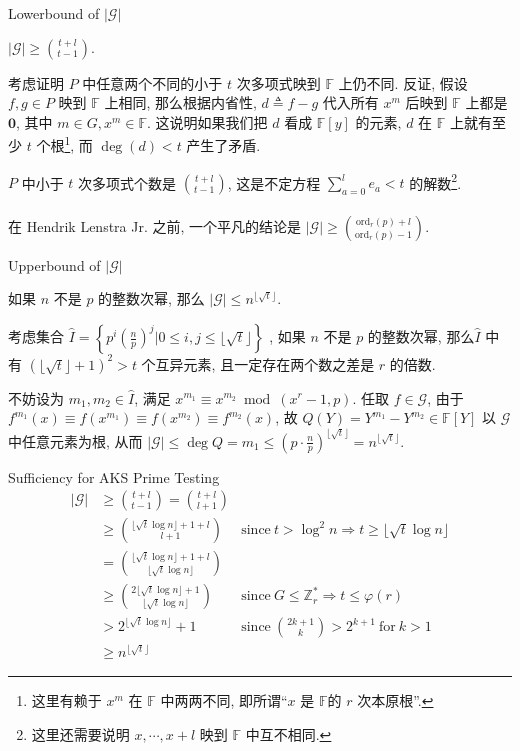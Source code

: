 \documentclass{beamer}
\def\le{\leqslant}
\def\ge{\geqslant}
\def\ord{\textrm{ord}}
\begin{document}
\begin{frame}{Lowerbound of $|\mathcal G|$}
	\begin{lemma}
		$|\mathcal G| \ge \binom{t + l}{t - 1}$.
	\end{lemma}
	考虑证明 $P$ 中任意两个不同的小于 $t$ 次多项式映到 $\mathbb F$ 上仍不同. 反证, 假设 $f, g \in P$ 映到 $\mathbb F$ 上相同, 那么根据内省性, $d \triangleq f - g$ 代入所有 $x^m$ 后映到 $\mathbb F$ 上都是 $\mathbf{0}$, 其中 $m \in G, x^m \in \mathbb F$. 这说明如果我们把 $d$ 看成 $\mathbb F[y]$ 的元素, $d$ 在 $\mathbb F$ 上就有至少 $t$ 个根\footnote{\tiny 这里有赖于 $x^m$ 在 $\mathbb F$ 中两两不同, 即所谓“$x$ 是 $\mathbb F$的 $r$ 次本原根”.}, 而 $\deg (d) < t$ 产生了矛盾. 

	$P$ 中小于 $t$ 次多项式个数是 $\binom{t + l}{t - 1}$, 这是不定方程 $\sum\limits_{a=0}^{l}e_a < t$ 的解数\footnote{\tiny 这里还需要说明 $x, \cdots, x + l$ 映到 $\mathbb F$ 中互不相同.}.\\~\\

	{\kaishu{} 在 Hendrik Lenstra Jr. 之前, 一个平凡的结论是 $|\mathcal G| \ge \binom{\ord_r(p) + l}{\ord_r(p) - 1}$.}

\end{frame}
\begin{frame}{Upperbound of $|\mathcal G|$}
	\begin{lemma}
		如果 $n$ 不是 $p$ 的整数次幂, 那么 $|\mathcal G| \le n^{\lfloor\sqrt{t}\rfloor}$.
	\end{lemma}
	考虑集合 $\hat{I} = \left\{p^i\left(\frac np\right)^j \bigg| 0 \le i, j \le \lfloor \sqrt {t}\rfloor \right\}$ , 如果 $n$ 不是 $p$ 的整数次幂, 那么$\hat{I}$ 中有 $(\lfloor\sqrt t\rfloor + 1)^2 > t$ 个互异元素, 且一定存在两个数之差是 $r$ 的倍数.
	
	不妨设为 $m_1, m_2 \in \hat{I}$, 满足 $x^{m_1} \equiv x^{m_2} \bmod (x^r-1, p)$. 任取 $f \in \mathcal G$, 由于 $f^{m_1}(x) \equiv f(x^{m_1}) \equiv f(x^{m_2}) \equiv f^{m_2}(x)$, 故 $Q(Y) = Y^{m_1} - Y^{m_2} \in \mathbb F[Y]$ 以 $\mathcal G$ 中任意元素为根, 从而 $|\mathcal G| \le \deg Q = m_1 \le (p \cdot \frac np)^{\lfloor \sqrt {t}\rfloor} = n^{\lfloor \sqrt {t}\rfloor}$.

\end{frame}
\begin{frame}{Sufficiency for AKS Prime Testing}
	\begin{align*}
		|\mathcal G| &\ge \binom{t + l}{t - 1} = \binom{t + l}{l + 1} & \\
		&\ge \binom{\lfloor \sqrt{t}\log n\rfloor + 1 + l}{l + 1} & \textrm{since} \ t > \log^2n \Rightarrow t \ge \lfloor \sqrt{t}\log n\rfloor\\
		&= \binom{\lfloor \sqrt{t}\log n\rfloor + 1 + l}{\lfloor \sqrt{t}\log n\rfloor} & \\
		&\ge \binom{2\lfloor \sqrt{t}\log n\rfloor + 1 }{\lfloor \sqrt{t}\log n\rfloor} & \textrm{since} \ G \le \mathbb Z_r^* \Rightarrow t \le \varphi(r) \\
		&>2^{\lfloor \sqrt{t}\log n\rfloor}+1 & \textrm{since} \ \binom{2k+1}{k} > 2^{k+1} \ \textrm{for} \ k > 1\\
		&\ge n^{\lfloor \sqrt t \rfloor}&
	\end{align*}
\end{frame}
\end{document}
